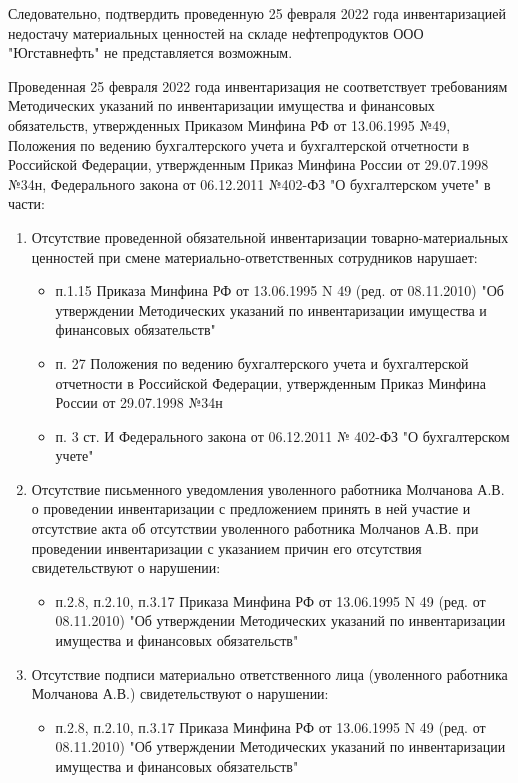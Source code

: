 \documentclass[a4paper]{article}
\begin{document}
		Следовательно, подтвердить проведенную 25 февраля 2022 года инвентаризацией недостачу материальных ценностей на складе нефтепродуктов ООО "Югставнефть" не представляется возможным.
			
		Проведенная 25 февраля 2022 года инвентаризация не соответствует требованиям Методических указаний по инвентаризации имущества и финансовых обязательств, утвержденных Приказом Минфина РФ от 13.06.1995 №49, Положения по ведению бухгалтерского учета и бухгалтерской отчетности в Российской Федерации, утвержденным Приказ Минфина России от 29.07.1998 №34н, Федерального закона от 06.12.2011 №402-ФЗ "О бухгалтерском учете" в части:
		
		\begin{enumerate}
			\item Отсутствие проведенной обязательной инвентаризации товарно-материальных ценностей при смене материально-ответственных сотрудников нарушает: \begin{itemize}
				\item  п.1.15 Приказа Минфина РФ от 13.06.1995 N 49 (ред. от 08.11.2010) "Об утверждении Методических указаний по инвентаризации имущества и финансовых обязательств"

				\item п. 27 Положения по ведению бухгалтерского учета и бухгалтерской отчетности в Российской Федерации, утвержденным Приказ Минфина России от 29.07.1998 №34н
				
				\item  п. 3 ст. И Федерального закона от 06.12.2011 № 402-ФЗ "О бухгалтерском учете"
			\end{itemize}
			
			\item Отсутствие письменного уведомления уволенного работника Молчанова А.В. о проведении инвентаризации с предложением принять в ней участие и отсутствие акта об отсутствии уволенного работника Молчанов А.В. при проведении инвентаризации с указанием причин его отсутствия свидетельствуют о нарушении: \begin{itemize}
				\item п.2.8, п.2.10, п.3.17 Приказа Минфина РФ от 13.06.1995 N 49 (ред. от 08.11.2010)    "Об утверждении Методических указаний по инвентаризации имущества и финансовых обязательств"
			\end{itemize}
			
			\item Отсутствие подписи материально ответственного лица (уволенного работника Молчанова А.В.) свидетельствуют о нарушении: \begin{itemize}
				\item п.2.8, п.2.10, п.3.17 Приказа Минфина РФ от 13.06.1995 N 49 (ред. от 08.11.2010)    "Об утверждении Методических указаний по инвентаризации имущества и финансовых обязательств"
			\end{itemize}
			

\end{enumerate}
\end{document}
